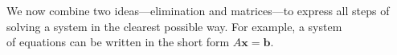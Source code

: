 \documentclass[preview]{standalone}
\begin{document}
\begin{center}
We now combine two ideas—elimination and matrices—to express all steps of solving a system in the clearest possible way. For example, a system \\of equations can be written in the short form $A \mathbf{x} = \mathbf{b}.$
\end{center}
\end{document}
